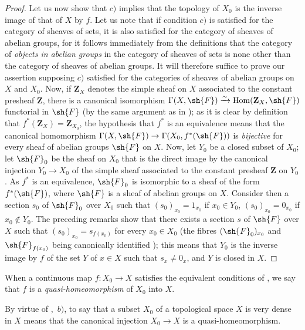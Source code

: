 \begin{proof}
Let us now show that $c)$ implies that the topology of $X_0$ is the inverse image of that of $X$ by $f$.
Let us note that if condition $c)$ is satisfied for the category of sheaves of sets, it is also satisfied for the category of sheaves of abelian groups, for it follows immediately from the definitions  that the category of \emph{objects in abelian groups} in the category of sheaves of sets is none other than the category of sheaves of abelian groups.
It will therefore suffice to prove our assertion supposing $c)$ satisfied for the categories of sheaves of abelian groups on $X$ and $X_0$.
Now, if $\mathbf{Z}_X$ denotes the simple sheaf on $X$ associated to the constant presheaf $\mathbf{Z}$, there is a canonical isomorphism $\Gamma(X,\sh{F})\xrightarrow{\sim}\operatorname{Hom}(\mathbf{Z}_X,\sh{F})$ functorial in $\sh{F}$ (by the same argument as in ); as it is clear by definition  that $f^*(\mathbf{Z}_X)=\mathbf{Z}_{X_0}$, the hypothesis that $f^*$ is an equivalence means that the canonical homomorphism $\Gamma(X,\sh{F})\to\Gamma(X_0,f^*(\sh{F}))$ is \emph{bijective} for every sheaf of abelian groups $\sh{F}$ on $X$.
Now, let $Y_0$ be a closed subset of $X_0$; let $\sh{F}_0$ be the sheaf on $X_0$ that is the direct image by the canonical injection $Y_0\to X_0$ of the simple sheaf associated to the constant presheaf $\mathbf{Z}$ on $Y_0$.
As $f^*$ is an equivalence, $\sh{F}_0$ is isomorphic to a sheaf of the form $f^*(\sh{F})$, where $\sh{F}$ is a sheaf of abelian groups on $X$.
Consider then a section $s_0$ of $\sh{F}_0$ over $X_0$ such that $(s_0)_{x_0}=1_{x_0}$ if $x_0\in Y_0$, $(s_0)_{x_0}=0_{x_0}$ if $x_0\notin Y_0$.
The preceding remarks show that there exists a section $s$ of $\sh{F}$ over $X$ such that $(s_0)_{x_0}=s_{f(x_0)}$ for every $x_0\in X_0$ (the fibres $(\sh{F}_0)_{x_0}$ and $\sh{F}_{f(x_0)}$ being canonically identified ); this means that $Y_0$ is the inverse image by $f$ of the set $Y$ of $x\in X$ such that $s_x\neq 0_x$, and $Y$ is closed in $X$.
\end{proof}

\begin{definition}[10.2.2]
\label{IV.10.2.2}
When a continuous map $f:X_0\to X$ satisfies the equivalent conditions of , we say that $f$ is a \emph{quasi-homeomorphism} of $X_0$ into $X$.
\end{definition}

By virtue of ,~$b)$, to say that a subset $X_0$ of a topological space $X$ is very dense in $X$ means that the canonical injection $X_0\to X$ is a quasi-homeomorphism.

